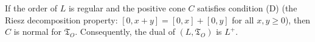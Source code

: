 If the order of $L$ is regular and the positive cone $C$ satisfies condition (D) (the Riesz decomposition property: $[0, x+y] = [0, x] + [0, y]$ for all $x, y \geq 0$), then $C$ is normal for $\mathfrak{T}_O$. Consequently, the dual of $(L, \mathfrak{T}_O)$ is $L^+$.
